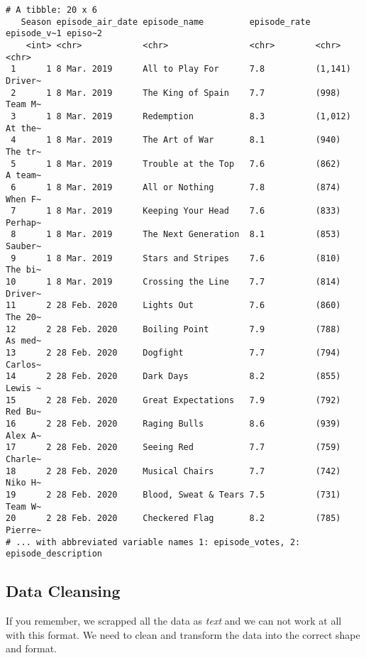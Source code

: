 \documentclass[
  letterpaper,
  DIV=11,
  numbers=noendperiod]{scrartcl}
\begin{document}
\begin{verbatim}
# A tibble: 20 x 6
   Season episode_air_date episode_name         episode_rate episode_v~1 episo~2
    <int> <chr>            <chr>                <chr>        <chr>       <chr>  
 1      1 8 Mar. 2019      All to Play For      7.8          (1,141)     Driver~
 2      1 8 Mar. 2019      The King of Spain    7.7          (998)       Team M~
 3      1 8 Mar. 2019      Redemption           8.3          (1,012)     At the~
 4      1 8 Mar. 2019      The Art of War       8.1          (940)       The tr~
 5      1 8 Mar. 2019      Trouble at the Top   7.6          (862)       A team~
 6      1 8 Mar. 2019      All or Nothing       7.8          (874)       When F~
 7      1 8 Mar. 2019      Keeping Your Head    7.6          (833)       Perhap~
 8      1 8 Mar. 2019      The Next Generation  8.1          (853)       Sauber~
 9      1 8 Mar. 2019      Stars and Stripes    7.6          (810)       The bi~
10      1 8 Mar. 2019      Crossing the Line    7.7          (814)       Driver~
11      2 28 Feb. 2020     Lights Out           7.6          (860)       The 20~
12      2 28 Feb. 2020     Boiling Point        7.9          (788)       As med~
13      2 28 Feb. 2020     Dogfight             7.7          (794)       Carlos~
14      2 28 Feb. 2020     Dark Days            8.2          (855)       Lewis ~
15      2 28 Feb. 2020     Great Expectations   7.9          (792)       Red Bu~
16      2 28 Feb. 2020     Raging Bulls         8.6          (939)       Alex A~
17      2 28 Feb. 2020     Seeing Red           7.7          (759)       Charle~
18      2 28 Feb. 2020     Musical Chairs       7.7          (742)       Niko H~
19      2 28 Feb. 2020     Blood, Sweat & Tears 7.5          (731)       Team W~
20      2 28 Feb. 2020     Checkered Flag       8.2          (785)       Pierre~
# ... with abbreviated variable names 1: episode_votes, 2: episode_description
\end{verbatim}

\hypertarget{data-cleansing}{%
\subsection{Data Cleansing}\label{data-cleansing}}

If you remember, we scrapped all the data as \emph{text} and we can not
work at all with this format. We need to clean and transform the data
into the correct shape and format.
\end{document}
